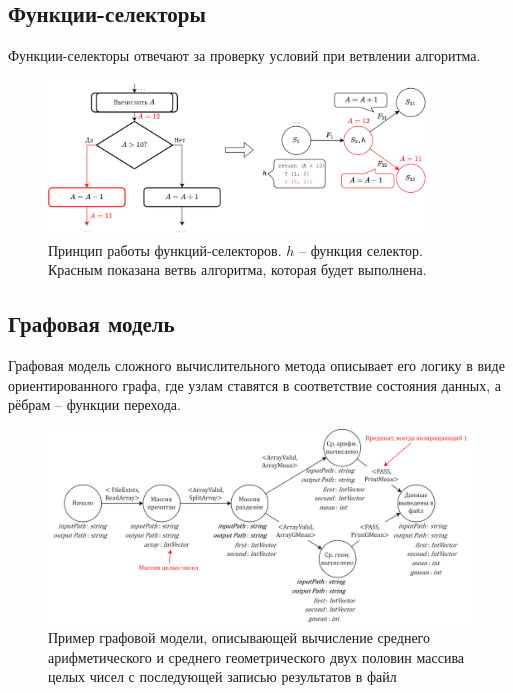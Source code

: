 \subsection{Функции-селекторы}

\begin{frame}
	Функции-селекторы отвечают за проверку условий при ветвлении алгоритма.

	\begin{figure}
		\centering
		\includegraphics[width=0.9\textwidth]{images/illustration.selector.png}
		\caption{Принцип работы функций-селекторов. $h$ -- функция селектор. Красным показана ветвь алгоритма, которая будет выполнена.}
	\end{figure}
\end{frame}

\subsection{Графовая модель}
\begin{frame}
	Графовая модель сложного вычислительного метода описывает его логику в виде ориентированного графа, где узлам ставятся в соответствие состояния данных, а рёбрам -- функции перехода.

	\begin{figure}
		\centering
		\includegraphics[width=\textwidth]{images/illustration.graph.png}
		\caption{Пример графовой модели, описывающей вычисление среднего арифметического и среднего геометрического двух половин массива целых чисел с последующей записью результатов в файл}
	\end{figure}

\end{frame}

